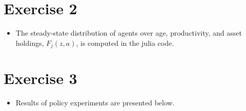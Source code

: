 \documentclass[11pt]{article} %
\begin{document}
\section*{Exercise 2}

\begin{itemize}
	\item The steady-state distribution of agents over age, productivity, and asset holdings, $F_{j}(z, a)$, is computed in the julia code.
	
\end{itemize}

\pagebreak

\section*{Exercise 3}
\begin{itemize}
	\item Results of policy experiments are presented below.\\

	


\end{itemize}
\end{document}
